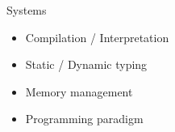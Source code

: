 \begin{frame}{Systems}
  \begin{center}
    \begin{itemize}
      \item Compilation / Interpretation
      \item Static / Dynamic typing
      \item Memory management
      \item Programming paradigm
    \end{itemize}
  \end{center}
\end{frame}